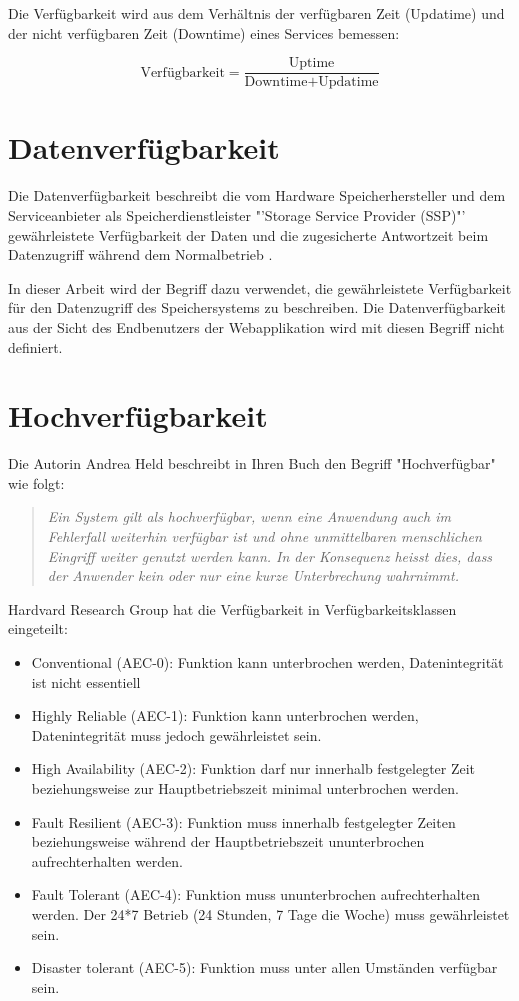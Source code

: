 Die Verfügbarkeit wird aus dem Verhältnis der verfügbaren Zeit (Updatime) und der nicht verfügbaren Zeit (Downtime) eines Services \cite{Held2004} bemessen:

\begin{equation}
\mbox{Verfügbarkeit} = \frac{\mbox{Uptime}}{ \mbox{Downtime} + \mbox{Updatime} }
\label{eqn:Verfügbarkeit}
\end{equation}

\section{Datenverfügbarkeit}
Die Datenverfügbarkeit beschreibt die vom Hardware Speicherhersteller und dem Serviceanbieter als Speicherdienstleister "'Storage Service Provider (SSP)"'  gewährleistete Verfügbarkeit der Daten und die zugesicherte Antwortzeit beim Datenzugriff während dem Normalbetrieb \cite{TechTarget2001}.

In dieser Arbeit wird der Begriff dazu verwendet, die gewährleistete Verfügbarkeit für den Datenzugriff des Speichersystems zu beschreiben. Die Datenverfügbarkeit aus der Sicht des Endbenutzers der Webapplikation wird mit diesen Begriff nicht definiert. 

\section{Hochverfügbarkeit}
Die Autorin Andrea Held beschreibt in Ihren Buch den Begriff "Hochverfügbar" wie folgt:
\begin{quotation}\em
Ein System gilt als hochverfügbar, wenn eine Anwendung auch im Fehlerfall weiterhin verfügbar ist und ohne unmittelbaren menschlichen Eingriff weiter genutzt werden kann. In der Konsequenz heisst dies, dass der Anwender kein oder nur eine kurze Unterbrechung wahrnimmt.\end{quotation}\cite{Held2004}

Hardvard Research Group hat die Verfügbarkeit in Verfügbarkeitsklassen eingeteilt:

\begin{itemize}
\item Conventional (AEC-0): Funktion kann unterbrochen werden, Datenintegrität ist nicht essentiell
\item Highly Reliable (AEC-1): Funktion kann unterbrochen werden, Datenintegrität muss jedoch gewährleistet sein.
\item High Availability (AEC-2): Funktion darf nur innerhalb festgelegter Zeit beziehungsweise zur Hauptbetriebszeit minimal unterbrochen werden.
\item Fault Resilient (AEC-3): Funktion muss innerhalb festgelegter Zeiten beziehungsweise während der Hauptbetriebszeit ununterbrochen aufrechterhalten werden.
\item Fault Tolerant (AEC-4): Funktion muss ununterbrochen aufrechterhalten werden. Der 24*7 Betrieb (24 Stunden, 7 Tage die Woche) muss gewährleistet sein.
\item Disaster tolerant (AEC-5): Funktion muss unter allen Umständen verfügbar sein.
\end{itemize}
\cite{Held2004}

